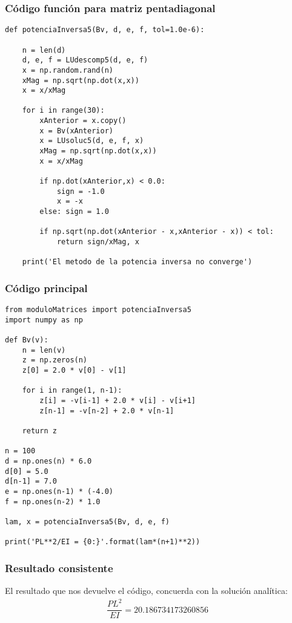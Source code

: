 \documentclass[12pt]{beamer}
\begin{document}
\begin{frame}
\frametitle{Código función para matriz pentadiagonal}
\begin{lstlisting}[caption=Código para el método de la potencia inversa con matriz en banda 
n=5]
def potenciaInversa5(Bv, d, e, f, tol=1.0e-6):
    
    n = len(d)
    d, e, f = LUdescomp5(d, e, f)
    x = np.random.rand(n)
    xMag = np.sqrt(np.dot(x,x))
    x = x/xMag
    
    for i in range(30):
        xAnterior = x.copy()
        x = Bv(xAnterior)
        x = LUsoluc5(d, e, f, x)
        xMag = np.sqrt(np.dot(x,x))
        x = x/xMag
        
        if np.dot(xAnterior,x) < 0.0:
            sign = -1.0
            x = -x
        else: sign = 1.0
        
        if np.sqrt(np.dot(xAnterior - x,xAnterior - x)) < tol:
            return sign/xMag, x
    
    print('El metodo de la potencia inversa no converge')
\end{lstlisting}
\end{frame}
\begin{frame}
\frametitle{Código principal}
\begin{lstlisting}[caption=Código para resolver el ejercicio]
from moduloMatrices import potenciaInversa5
import numpy as np

def Bv(v):
    n = len(v)
    z = np.zeros(n)
    z[0] = 2.0 * v[0] - v[1]
    
    for i in range(1, n-1):
        z[i] = -v[i-1] + 2.0 * v[i] - v[i+1]
        z[n-1] = -v[n-2] + 2.0 * v[n-1]
    
    return z

n = 100
d = np.ones(n) * 6.0
d[0] = 5.0
d[n-1] = 7.0
e = np.ones(n-1) * (-4.0)
f = np.ones(n-2) * 1.0

lam, x = potenciaInversa5(Bv, d, e, f)

print('PL**2/EI = {0:}'.format(lam*(n+1)**2))
\end{lstlisting}
\end{frame}
\begin{frame}
\frametitle{Resultado consistente}
El resultado que nos devuelve el código, concuerda con la solución analítica:
\pause
\begin{align*}
\dfrac{P L^{2}}{E I} = 20.186734173260856
\end{align*}
\end{frame}
\end{document}
